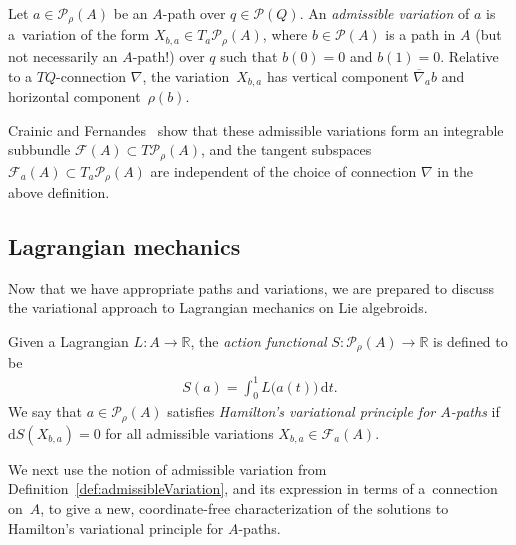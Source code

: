 \documentclass[pdftex]{sigma}
\numberwithin{equation}{section}
\begin{document}
\begin{Definition}\label{def:admissibleVariation}
Let $ a \in \mathcal{P} _\rho (A) $ be an $A$-path over $ q \in \mathcal{P} (Q) $. An \emph{admissible variation} of $a$ is a~variation of the form $ X _{ b, a } \in T _a \mathcal{P} _\rho (A) $, where $ b \in \mathcal{P} (A) $ is a path in $A$ (but not necessarily an $A$-path!) over $q$ such that $ b (0) = 0 $ and $ b (1) = 0 $. Relative to a $ T Q $-connection $ \nabla $, the varia\-tion~$ X _{ b, a } $ has vertical component $ \overline{\nabla } _a b $ and horizontal component~$ \rho (b) $.
\end{Definition}

\begin{Remark} \label{rmk:admissibleSubbundle} Crainic and Fernandes~\cite[Proposition~4.7]{CrFe2003} show that these admissible variations form an integrable subbundle $ \mathcal{F} (A) \subset T \mathcal{P} _\rho (A) $, and the tangent subspaces $ \mathcal{F} _a (A) \subset T _a \mathcal{P} _\rho (A) $ are independent of the choice of connection $ \nabla $ in the above def\/inition.
\end{Remark}

\subsection{Lagrangian mechanics}\label{sec:algebroidLagrangianMechanics}

Now that we have appropriate paths and variations, we are prepared to discuss the variational approach to Lagrangian mechanics on Lie algebroids.

\begin{Definition} Given a Lagrangian $ L \colon A \rightarrow \mathbb{R} $, the \emph{action functional} $ S \colon \mathcal{P} _\rho (A) \rightarrow \mathbb{R} $ is def\/ined to be
 \begin{gather*}
 S (a) = \int _0 ^1 L \bigl( a (t) \bigr) \,\mathrm{d}t .
 \end{gather*}
We say that $ a \in \mathcal{P} _\rho (A) $ satisf\/ies \emph{Hamilton's variational principle for $A$-paths} if $ \mathrm{d} S ( X _{ b , a } ) = 0 $ for all admissible variations $ X _{ b, a } \in \mathcal{F} _a (A) $.
\end{Definition}

We next use the notion of admissible variation from Def\/inition~\ref{def:admissibleVariation}, and its expression in terms of a~connection on~$A$, to give a new, coordinate-free characterization of the solutions to Hamilton's variational principle for $A$-paths.
\end{document}
